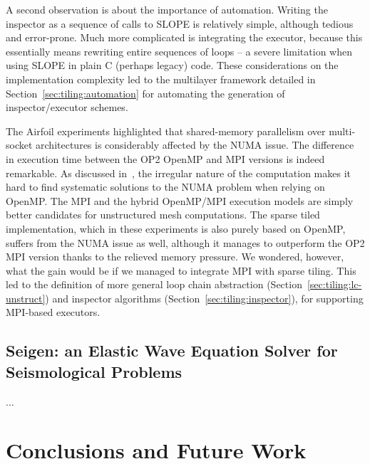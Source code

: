 A second observation is about the importance of automation. Writing the inspector as a sequence of calls to SLOPE is relatively simple, although tedious and error-prone. Much more complicated is integrating the executor, because this essentially means rewriting entire sequences of loops -- a severe limitation when using SLOPE in plain C (perhaps legacy) code. These considerations on the implementation complexity led to the multilayer framework detailed in Section~\ref{sec:tiling:automation} for automating the generation of inspector/executor schemes. 

The Airfoil experiments highlighted that shared-memory parallelism over multi-socket architectures is considerably affected by the NUMA issue. The difference in execution time between the OP2 OpenMP and MPI versions is indeed remarkable. As discussed in~\cite{hydra-op2}, the irregular nature of the computation makes it hard to find systematic solutions to the NUMA problem when relying on OpenMP. The MPI and the hybrid OpenMP/MPI execution models are simply better candidates for unstructured mesh computations. The sparse tiled implementation, which in these experiments is also purely based on OpenMP, suffers from the NUMA issue as well, although it manages to outperform the OP2 MPI version thanks to the relieved memory pressure. We wondered, however, what the gain would be if we managed to integrate MPI with sparse tiling. This led to the definition of more general loop chain abstraction (Section~\ref{sec:tiling:lc-unstruct}) and inspector algorithms (Section~\ref{sec:tiling:inspector}), for supporting MPI-based executors.

\subsection{Seigen: an Elastic Wave Equation Solver for Seismological Problems}
\label{sec:tiling:seigen}
...

\section{Conclusions and Future Work}
